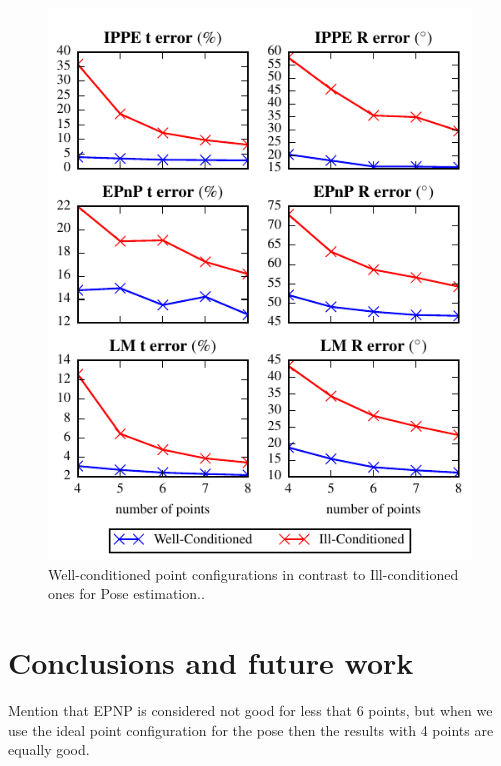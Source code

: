 \documentclass[letterpaper, 10 pt, conference]{ieeeconf}  %
\begin{document}
	
	\begin{figure}[t]
		\begin{center}
			\includegraphics[width=\columnwidth]{img/point_config_comp_pose.pdf}
			\caption{\label{fig:homography_results} Well-conditioned point configurations in contrast to Ill-conditioned ones for Pose estimation..}
		\end{center}
	\end{figure}
	
	
	
	\section{Conclusions and future work}
	\label{Conc}
	Mention that EPNP is considered not good for less that 6 points, but when we use the ideal point configuration for the pose then the results with 4 points are equally good.
	
\end{document}
